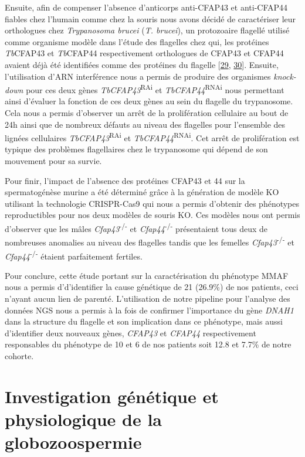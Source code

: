 \documentclass[12pt,a4paper,twoside]{ugathesis}
\begin{document}
Ensuite, afin de compenser l'absence d'anticorps anti-CFAP43 et
anti-CFAP44 fiables chez l'humain comme chez la souris nous avons décidé
de caractériser leur orthologues chez \emph{Trypanosoma brucei}
(\emph{T. brucei}), un protozoaire flagellé utilisé comme organisme
modèle dans l'étude des flagelles chez qui, les protéines
\emph{Tb}CFAP43 et \emph{Tb}CFAP44 respectivement orthologues de CFAP43
et CFAP44 avaient déjà été identifiées comme des protéines du flagelle
{[}\protect\hyperlink{ref-Broadhead2006}{29},
\protect\hyperlink{ref-Subota2014}{30}{]}. Ensuite, l'utilisation d'ARN
interférence nous a permis de produire des organismes \emph{knock-down}
pour ces deux gènes \emph{TbCFAP43}\textsuperscript{RAi} et
\emph{TbCFAP44}\textsuperscript{RNAi} nous permettant ainsi d'évaluer la
fonction de ces deux gènes au sein du flagelle du trypanosome. Cela nous
a permis d'observer un arrêt de la prolifération cellulaire au bout de
24h ainsi que de nombreux défauts au niveau des flagelles pour
l'ensemble des lignées cellulaires \emph{TbCFAP43}\textsuperscript{RAi}
et \emph{TbCFAP44}\textsuperscript{RNAi}. Cet arrêt de prolifération est
typique des problèmes flagellaires chez le trypanosome qui dépend de son
mouvement pour sa survie.

Pour finir, l'impact de l'absence des protéines CFAP43 et 44 sur la
spermatogénèse murine a été déterminé grâce à la génération de modèle KO
utilisant la technologie CRISPR-Cas9 qui nous a permis d'obtenir des
phénotypes reproductibles pour nos deux modèles de souris KO. Ces
modèles nous ont permis d'observer que les mâles
\emph{Cfap43}\textsuperscript{-/-} et \emph{Cfap44}\textsuperscript{-/-}
présentaient tous deux de nombreuses anomalies au niveau des flagelles
tandis que les femelles \emph{Cfap43}\textsuperscript{-/-} et
\emph{Cfap44}\textsuperscript{-/-} étaient parfaitement fertiles.

Pour conclure, cette étude portant sur la caractérisation du phénotype
MMAF nous a permis d'd'identifier la cause génétique de 21 (26.9\%) de
nos patients, ceci n'ayant aucun lien de parenté. L'utilisation de notre
pipeline pour l'analyse des données NGS nous a permis à la fois de
confirmer l'importance du gène \emph{DNAH1} dans la structure du
flagelle et son implication dans ce phénotype, mais aussi d'identifier
deux nouveaux gènes, \emph{CFAP43} et \emph{CFAP44} respectivement
responsables du phénotype de 10 et 6 de nos patients soit 12.8 et 7.7\%
de notre cohorte.

\chapter{Investigation génétique et physiologique de la
globozoospermie}\label{globo}
\end{document}
